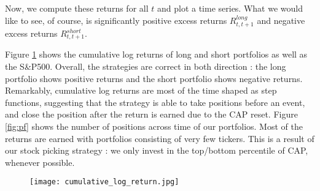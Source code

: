 Now, we compute these returns for all $t$ and plot a time series.  What we would like to see, of course, is significantly positive excess returns $R^{long}_{t,t+1}$ and negative excess returns $R^{short}_{t,t+1}$. 

Figure \ref{fig:cumretpf} shows the cumulative log returns of long and short portfolios as well as the S\&P500. Overall, the strategies are correct in both direction : the long portfolio shows positive returns and the short portfolio shows negative returns. Remarkably, cumulative log returns are most of the time shaped as step functions, suggesting that the strategy is able to take positions before an event, and close the position after the return is earned due to the CAP reset. Figure \ref{fig:pf} shows the number of positions across time of our portfolios. Most of the returns are earned with portfolios consisting of very few tickers. This is a result of our stock picking strategy : we only invest in the top/bottom percentile of CAP, whenever possible.

\begin{figure}
    \centering
    \texttt{[image: cumulative\_log\_return.jpg]}
    \label{fig:cumretpf}
\end{figure}

